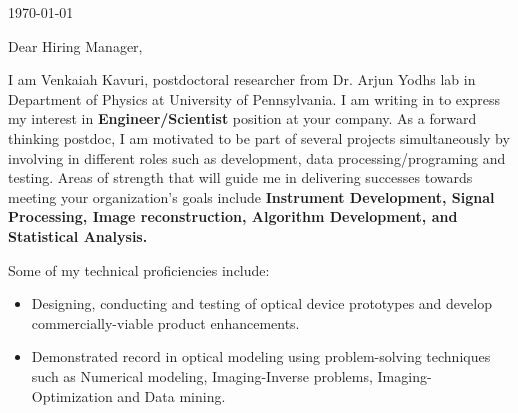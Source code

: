 \documentclass{my_cv}
\begin{document}
\vspace{-2mm}
\begin{center} 
\begin{footnotesize}
\end{footnotesize}

\href{https://www.linkedin.com/in/venkaiahchowdarykavuri}{\faLinkedinSquare} \href{https://github.com/Venki-Kavuri}{\faGithub} \href{https://scholar.google.com/citations?hl=en&user=r5E9ACIAAAAJ&view_op=list_works}{\aiGoogleScholar} \href{https://www.facebook.com/venki.kavuri}{\faFacebookOfficial}
\end{center} 
\vspace{5mm} 
\today\\
\vspace{5mm} 



Dear Hiring Manager,\\
\vspace{2mm}

I am Venkaiah Kavuri, postdoctoral researcher from Dr. Arjun Yodh\textquotesingle s lab in Department of Physics at University of Pennsylvania. I am writing in to express my interest in \textbf{Engineer/Scientist} position at your company. As a forward thinking postdoc, I am motivated to be part of several projects simultaneously by involving in different roles such as development, data processing/programing and testing. Areas of strength that will guide me in delivering successes towards meeting your organization's goals include  \textbf{Instrument Development, Signal Processing, Image reconstruction, Algorithm Development, and Statistical Analysis.}\\
\vspace{2mm} 


Some of my technical proficiencies include:\\
\begin{itemize}\itemsep -2pt
\item Designing, conducting and testing of optical device prototypes and develop commercially-viable product enhancements.\\
\item Demonstrated record in optical modeling using problem-solving techniques such as Numerical modeling, Imaging-Inverse problems, Imaging-Optimization and Data mining.\\

\end{itemize} 
\end{document}
